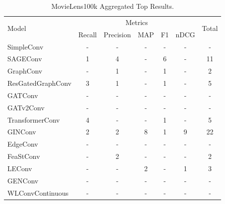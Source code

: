 \documentclass[bst/sn-nature]{sn-jnl}
\begin{document}
\begin{appendices}
\begin{table}[htbp]
    \centering 
    \begin{tabular}{|l|*{5}{c|}c|}
    \hline
    \multirow{2}{*}{Model} & \multicolumn{5}{c|}{Metrics} & \multirow{2}{*}{Total} \\
    \hhline{~*{5}{|-}|~|}
                             & Recall & Precision & MAP & F1 & nDCG & \\ \hline
    \rowcolor[gray]{0.9} SimpleConv               & - & - & - & - & - & - \\ 
    SAGEConv                 & 1 & 4 & - & 6 & - & 11 \\ 
    \rowcolor[gray]{0.9} GraphConv                & - & 1 & - & 1 & - & 2 \\ 
    ResGatedGraphConv        & 3 & 1 & - & 1 & - & 5 \\ 
    \rowcolor[gray]{0.9} GATConv                  & - & - & - & - & - & - \\ 
    GATv2Conv                & - & - & - & - & - & - \\ 
    \rowcolor[gray]{0.9} TransformerConv          & 4 & - & - & 1 & - & 5 \\ 
    GINConv                  & 2 & 2 & 8 & 1 & 9 & 22 \\ 
    \rowcolor[gray]{0.9} EdgeConv                 & - & - & - & - & - & - \\ 
    FeaStConv                & - & 2 & - & - & - & 2 \\ 
    \rowcolor[gray]{0.9} LEConv                   & - & - & 2 & - & 1 & 3 \\ 
    GENConv                  & - & - & - & - & - & - \\ 
    \rowcolor[gray]{0.9} WLConvContinuous         & - & - & - & - & - & - \\ \hline
    \end{tabular}
    \caption{MovieLens100k Aggregated Top Results.}
    \label{tab:aggregated}
\end{table}

\end{appendices}

\clearpage

\begin{multicols}{2}




\end{multicols}
\end{document}
